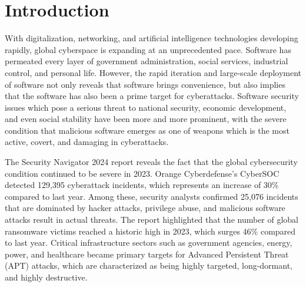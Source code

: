 %
%
%
%
\chapter{Introduction}

\label{chap:intro}

With digitalization, networking, and artificial intelligence technologies developing rapidly, global cyberspace is expanding at an unprecedented pace. Software has permeated every layer of government administration, social services, industrial control, and personal life. However, the rapid iteration and large-scale deployment of software not only reveals that software brings convenience, but also implies that the software has also been a prime target for cyberattacks. Software security issues which pose a serious threat to national security, economic development, and even social stability have been more and more prominent, with the severe condition that malicious software emerges as one of weapons which is the most active, covert, and damaging in cyberattacks.

The Security Navigator 2024 report reveals the fact that the global cybersecurity condition continued to be severe in 2023. Orange Cyberdefense's CyberSOC detected 129,395 cyberattack incidents, which represents an increase of 30\% compared to last year. Among these, security analysts confirmed 25,076 incidents that are dominated by hacker attacks, privilege abuse, and malicious software attacks result in actual threats. The report highlighted that the number of global ransomware victims reached a historic high in 2023, which surges 46\% compared to last year. Critical infrastructure sectors such as government agencies, energy, power, and healthcare became primary targets for Advanced Persistent Threat (APT) attacks, which are characterized as being highly targeted, long-dormant, and highly destructive.\cite{securitynavigator2024}

